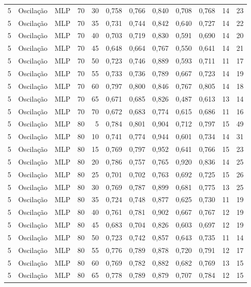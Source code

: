 \begin{longtable}{@{}rllrrrrrrrrr@{}}
5 & Oscilação & MLP & 70 & 30 & 0,758 & 0,766 & 0,840 & 0,708 & 0,768 & 14 & 23 \\
5 & Oscilação & MLP & 70 & 35 & 0,731 & 0,744 & 0,842 & 0,640 & 0,727 & 14 & 22 \\
5 & Oscilação & MLP & 70 & 40 & 0,703 & 0,719 & 0,830 & 0,591 & 0,690 & 14 & 20 \\
5 & Oscilação & MLP & 70 & 45 & 0,648 & 0,664 & 0,767 & 0,550 & 0,641 & 14 & 21 \\
5 & Oscilação & MLP & 70 & 50 & 0,723 & 0,746 & 0,889 & 0,593 & 0,711 & 11 & 17 \\
5 & Oscilação & MLP & 70 & 55 & 0,733 & 0,736 & 0,789 & 0,667 & 0,723 & 14 & 19 \\
5 & Oscilação & MLP & 70 & 60 & 0,797 & 0,800 & 0,846 & 0,767 & 0,805 & 14 & 18 \\
5 & Oscilação & MLP & 70 & 65 & 0,671 & 0,685 & 0,826 & 0,487 & 0,613 & 13 & 14 \\
5 & Oscilação & MLP & 70 & 70 & 0,672 & 0,683 & 0,774 & 0,615 & 0,686 & 11 & 16 \\
5 & Oscilação & MLP & 80 & 5 & 0,784 & 0,801 & 0,904 & 0,712 & 0,797 & 15 & 49 \\
5 & Oscilação & MLP & 80 & 10 & 0,741 & 0,774 & 0,944 & 0,601 & 0,734 & 14 & 31 \\
5 & Oscilação & MLP & 80 & 15 & 0,769 & 0,797 & 0,952 & 0,641 & 0,766 & 15 & 23 \\
5 & Oscilação & MLP & 80 & 20 & 0,786 & 0,757 & 0,765 & 0,920 & 0,836 & 14 & 25 \\
5 & Oscilação & MLP & 80 & 25 & 0,701 & 0,702 & 0,763 & 0,692 & 0,725 & 15 & 26 \\
5 & Oscilação & MLP & 80 & 30 & 0,769 & 0,787 & 0,899 & 0,681 & 0,775 & 13 & 25 \\
5 & Oscilação & MLP & 80 & 35 & 0,724 & 0,748 & 0,877 & 0,625 & 0,730 & 11 & 19 \\
5 & Oscilação & MLP & 80 & 40 & 0,761 & 0,781 & 0,902 & 0,667 & 0,767 & 12 & 19 \\
5 & Oscilação & MLP & 80 & 45 & 0,683 & 0,704 & 0,826 & 0,603 & 0,697 & 12 & 19 \\
5 & Oscilação & MLP & 80 & 50 & 0,723 & 0,742 & 0,857 & 0,643 & 0,735 & 11 & 14 \\
5 & Oscilação & MLP & 80 & 55 & 0,776 & 0,789 & 0,878 & 0,720 & 0,791 & 12 & 17 \\
5 & Oscilação & MLP & 80 & 60 & 0,769 & 0,782 & 0,882 & 0,682 & 0,769 & 13 & 15 \\
5 & Oscilação & MLP & 80 & 65 & 0,778 & 0,789 & 0,879 & 0,707 & 0,784 & 12 & 15 \\

\end{longtable}
